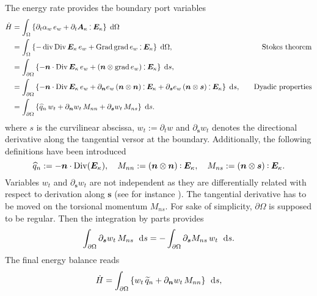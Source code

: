 The energy rate provides the boundary port variables
\begin{equation}\label{eq:enrateKirNotAll}
\begin{aligned}
\dot{H}&= \int_{\Omega} \left\{ \partial_t {\alpha_w} \, e_w  + \partial_t \bm{A}_{\kappa} \cddot \bm{E}_{\kappa} \right\} \d\Omega \\
&= \int_{\Omega} \left\{ - \div\Div \bm{E}_{\kappa} \, e_w + \Grad\grad e_w \cddot \bm{E}_{\kappa} \right\} \d\Omega, &\quad \text{Stokes theorem} \\
&=  \int_{\partial \Omega} \left\{ - \bm{n} \cdot \Div\bm{E}_{\kappa} \, e_w + \left(\bm{n} \otimes \grad e_w \right)\cddot \bm{E}_{\kappa} \right\} \d{s},  \\
&=\int_{\partial \Omega} \left\{ - \bm{n} \cdot \Div\bm{E}_{\kappa} \, e_w + \partial_{\bm{n}}{e_w} \left(\bm{n} \otimes \bm{n} \right) \cddot \bm{E}_{\kappa} + \partial_{\bm{s}}{e_w} \left(\bm{n} \otimes\bm{s} \right)\cddot \bm{E}_{\kappa}   \right\} \d{s}, &\quad \text{Dyadic properties}\\
&=\int_{\partial \Omega} \left\{ \widehat{q}_n \, w_t + \partial_{\bm{n}}{w_t} \, M_{nn} + \partial_{\bm{s}}{w_t} \, M_{ns}   \right\} \d{s}. 
\end{aligned}
\end{equation}
where $s$ is the curvilinear abscissa, $w_t:= \partial_t w$ and $\partial_{\bm{s}}{w_t}$ denotes the directional derivative along the tangential versor at the boundary. Additionally, the following definitions have been introduced
\begin{equation}\label{eq:qhat}
\widehat{q}_n :=  - \bm{n} \cdot \mathrm{Div}(\bm{E}_{\kappa}), \quad
M_{nn} := \left(\bm{n} \otimes \bm{n} \right) \cddot \bm{E}_{\kappa}, \quad
M_{ns} := \left(\bm{n} \otimes \bm{s} \right) \cddot \bm{E}_{\kappa}.
\end{equation}
Variables $w_t$ and $\partial_{\bm{s}}{w_t}$ are not independent as they are differentially related with respect to derivation along $\bm{s}$ (see for instance
\cite[Chapter 4]{timoshenko1959theory}). The tangential derivative has to be moved on the torsional momentum $M_{ns}$. For sake of simplicity, $\partial \Omega$ is supposed to be regular. Then the integration by parts provides
\begin{equation}
\int_{\partial \Omega} \partial_{\bm{s}}{w_t} \, M_{ns} \ \d{s} =  - \int_{\partial \Omega} \partial_{\bm{s}}{M_{ns}} \, w_t \ \d{s}.
\end{equation}
The final energy balance reads
\begin{equation}\label{eq:enrateKir}
\dot{H} = \int_{\partial \Omega} \left\{ w_t \, \widetilde{q}_n + \partial_{\bm{n}}{w_t} \, M_{nn}\right\} \, \d{s}, 
\end{equation} 
